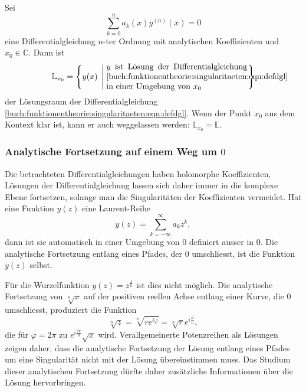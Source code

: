 \begin{definition}
\label{buch:funktionentheorie:singularitaeten:def:loesungsraum}
Sei 
\begin{equation}
\sum_{k=0}^n a_k(x) y^{(n)}(x) = 0
\label{buch:funktionentheorie:singularitaeten:eqn:defdgl}
\end{equation}
eine Differentialgleichung $n$-ter Ordnung mit analytischen Koeffizienten
und $x_0\in \mathbb{C}$.
Dann ist
\[
\mathbb{L}_{x_0}
=
\left\{
y(x)
\;\left|\;
\begin{minipage}{6cm}
$y$ ist Lösung der Differentialgleichung
\eqref{buch:funktionentheorie:singularitaeten:eqn:defdgl}
in einer Umgebung von $x_0$
\end{minipage}
\right.
\right\}
\]
der Lösungsraum der Differentialgleichung
\eqref{buch:funktionentheorie:singularitaeten:eqn:defdgl}.
Wenn der Punkt $x_0$ aus dem Kontext klar ist, kann er auch weggelassen
werden: $\mathbb{L}_{x_0}=\mathbb{L}$.
%
%
\end{definition}

%
%
\subsubsection{Analytische Fortsetzung auf einem Weg um $0$}
Die betrachteten Differentialgleichungen haben holomorphe
Koeffizienten, Lösungen der Differentialgleichung lassen sich
daher immer in die komplexe Ebene fortsetzen, solange man die
Singularitäten der Koeffizienten vermeidet.
Hat eine Funktion $y(z)$ eine Laurent-Reihe
\[
y(z) = \sum_{k=-\infty}^\infty a_kz^k,
\]
dann ist sie automatisch in einer Umgebung von $0$ definiert
ausser in $0$.
Die analytische Fortsetzung entlang eines Pfades, der $0$
umschliesst, ist die Funktion $y(z)$ selbst.

Für die Wurzelfunktion $y(z)=z^{\frac1n}$ ist dies nicht möglich.
Die analytische Fortsetzung von $\sqrt[n]{x}$ auf der positiven reellen
Achse entlang einer Kurve, die $0$ umschliesst,
produziert die Funktion
\[
\sqrt[n]{z}
=
\sqrt[n]{re^{i\varphi}}
=
\sqrt[n]{r}e^{i\frac{\varphi}n},
\]
die für $\varphi=2\pi$ zu $e^{i\frac{2\pi}n}\sqrt{x}$ wird.
Verallgemeinerte Potenzreihen als Lösungen zeigen daher, dass
die analytische Fortsetzung der Lösung entlang eines Pfades um
eine Singularität nicht mit der Lösung übereinstimmen muss.
Das Studium dieser analytischen Fortsetzung dürfte daher zusätzliche
Informationen über die Lösung hervorbringen.

